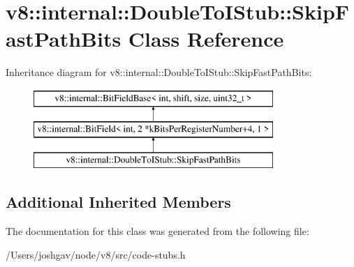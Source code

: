 \hypertarget{classv8_1_1internal_1_1_double_to_i_stub_1_1_skip_fast_path_bits}{}\section{v8\+:\+:internal\+:\+:Double\+To\+I\+Stub\+:\+:Skip\+Fast\+Path\+Bits Class Reference}
\label{classv8_1_1internal_1_1_double_to_i_stub_1_1_skip_fast_path_bits}
Inheritance diagram for v8\+:\+:internal\+:\+:Double\+To\+I\+Stub\+:\+:Skip\+Fast\+Path\+Bits\+:\begin{figure}[H]
\begin{center}
\leavevmode
\includegraphics[height=3.000000cm]{classv8_1_1internal_1_1_double_to_i_stub_1_1_skip_fast_path_bits}
\end{center}
\end{figure}
\subsection*{Additional Inherited Members}


The documentation for this class was generated from the following file\+:\begin{DoxyCompactItemize}
\item 
/\+Users/joshgav/node/v8/src/code-\/stubs.\+h\end{DoxyCompactItemize}
